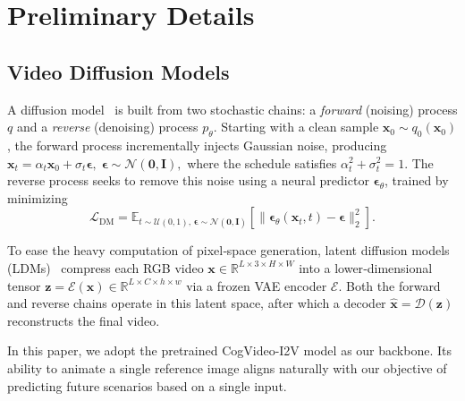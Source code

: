 \documentclass{article}
\begin{document}

\section{Preliminary Details}
\subsection{Video Diffusion Models}
\label{subsec:prelimiary}
A diffusion model~\cite{song2021denoising} is built from two stochastic chains: a \emph{forward} (noising) process $q$ and a \emph{reverse} (denoising) process $p_{\theta}$.  
Starting with a clean sample $\mathbf{x}_0\!\sim\!q_0(\mathbf{x}_0)$, the forward process incrementally injects Gaussian noise, producing
\(
\mathbf{x}_t=\alpha_t\mathbf{x}_0+\sigma_t\boldsymbol{\epsilon},
\;\boldsymbol{\epsilon}\sim\mathcal{N}(\mathbf{0},\mathbf{I}),
\)
where the schedule satisfies $\alpha_t^{2}+\sigma_t^{2}=1$.  
The reverse process seeks to remove this noise using a neural predictor $\boldsymbol{\epsilon}_{\theta}$, trained by minimizing
\begin{equation}
\mathcal{L}_{\text{DM}}
=\mathbb{E}_{t\sim\mathcal{U}(0,1),\,
           \boldsymbol{\epsilon}\sim\mathcal{N}(\mathbf{0},\mathbf{I})}
\!\left[
  \bigl\|
    \boldsymbol{\epsilon}_{\theta}(\mathbf{x}_t,t)
    -
    \boldsymbol{\epsilon}
  \bigr\|_2^{2}
\right].
\end{equation}

To ease the heavy computation of pixel‑space generation, latent diffusion models (LDMs)~\cite{metzer2022latent} compress each RGB video
$\mathbf{x}\!\in\!\mathbb{R}^{L\times3\times H\times W}$
into a lower‑dimensional tensor
$\mathbf{z}=\mathcal{E}(\mathbf{x})\!\in\!\mathbb{R}^{L\times C\times h\times w}$
via a frozen VAE encoder $\mathcal{E}$.  
Both the forward and reverse chains operate in this latent space, after which a decoder $\hat{\mathbf{x}}=\mathcal{D}(\mathbf{z})$ reconstructs the final video.

In this paper, we adopt the pretrained CogVideo-I2V\cite{yang2024cogvideox} model as our backbone. Its ability to animate a single reference image aligns naturally with our objective of predicting future scenarios based on a single input.
\end{document}

